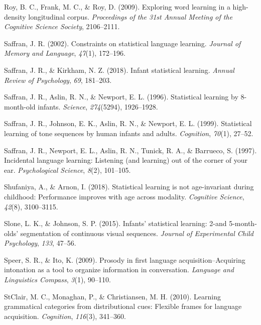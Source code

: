 \documentclass[man,mask,floatsintext]{apa6}
\theoremstyle{definition}
\theoremstyle{definition}
\theoremstyle{definition}
\theoremstyle{remark}
\begin{document}
\hypertarget{ref-roy2009exploring}{}
Roy, B. C., Frank, M. C., \& Roy, D. (2009). Exploring word learning in
a high-density longitudinal corpus. \emph{Proceedings of the 31st Annual
Meeting of the Cognitive Science Society}, 2106--2111.

\hypertarget{ref-saffran2002constraints}{}
Saffran, J. R. (2002). Constraints on statistical language learning.
\emph{Journal of Memory and Language}, \emph{47}(1), 172--196.

\hypertarget{ref-saffran2018infant}{}
Saffran, J. R., \& Kirkham, N. Z. (2018). Infant statistical learning.
\emph{Annual Review of Psychology}, \emph{69}, 181--203.

\hypertarget{ref-saffran1996statistical}{}
Saffran, J. R., Aslin, R. N., \& Newport, E. L. (1996). Statistical
learning by 8-month-old infants. \emph{Science}, \emph{274}(5294),
1926--1928.

\hypertarget{ref-saffran1999statistical}{}
Saffran, J. R., Johnson, E. K., Aslin, R. N., \& Newport, E. L. (1999).
Statistical learning of tone sequences by human infants and adults.
\emph{Cognition}, \emph{70}(1), 27--52.

\hypertarget{ref-saffran1997incidental}{}
Saffran, J. R., Newport, E. L., Aslin, R. N., Tunick, R. A., \&
Barrueco, S. (1997). Incidental language learning: Listening (and
learning) out of the corner of your ear. \emph{Psychological Science},
\emph{8}(2), 101--105.

\hypertarget{ref-shufaniya2018statistical}{}
Shufaniya, A., \& Arnon, I. (2018). Statistical learning is not
age-invariant during childhood: Performance improves with age across
modality. \emph{Cognitive Science}, \emph{42}(8), 3100--3115.

\hypertarget{ref-slone2015infants}{}
Slone, L. K., \& Johnson, S. P. (2015). Infants' statistical learning:
2-and 5-month-olds' segmentation of continuous visual sequences.
\emph{Journal of Experimental Child Psychology}, \emph{133}, 47--56.

\hypertarget{ref-speer2009prosody}{}
Speer, S. R., \& Ito, K. (2009). Prosody in first language
acquisition--Acquiring intonation as a tool to organize information in
conversation. \emph{Language and Linguistics Compass}, \emph{3}(1),
90--110.

\hypertarget{ref-clair2010learning}{}
StClair, M. C., Monaghan, P., \& Christiansen, M. H. (2010). Learning
grammatical categories from distributional cues: Flexible frames for
language acquisition. \emph{Cognition}, \emph{116}(3), 341--360.
\end{document}
